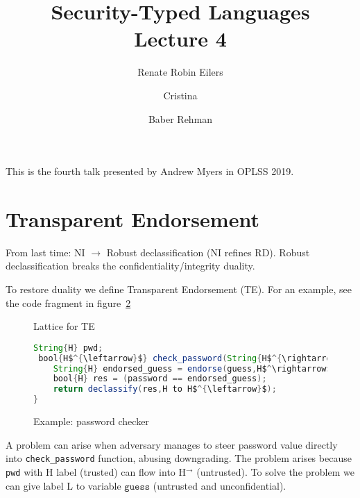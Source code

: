 \documentclass{article}
\title{Security-Typed Languages \\ \Large{Lecture 4}}
\author{Renate Robin Eilers  \and Cristina \and Baber Rehman}
\newcommand{\la}{^{\leftarrow}}
\newcommand{\ra}{^{\rightarrow}}
\begin{document}
\maketitle

This is the fourth talk presented by Andrew Myers in OPLSS 2019.

\section{Transparent Endorsement}

From last time: NI $\rightarrow$ Robust declassification (NI refines RD). Robust declassification breaks the confidentiality/integrity duality.

To restore duality  we define
Transparent Endorsement (TE). For an example, see the code fragment in figure~\ref{code1}
\begin{figure}[ht!]
\label{fig1}
\caption{Lattice for TE}
\end{figure}

\begin{figure}
\begin{lstlisting}[mathescape,frame=single,basicstyle=\ttfamily,language=java]
String{H} pwd;
 bool{H$^{\leftarrow}$} check_password(String{H$^{\rightarrow}$} guess) {
    String{H} endorsed_guess = endorse(guess,H$^\rightarrow$ to H);
    bool{H} res = (password == endorsed_guess);
    return declassify(res,H to H$^{\leftarrow}$);
}
\end{lstlisting}
\label{code1}
\caption{Example: password checker}
\end{figure}

A problem can arise when adversary manages to steer password value directly into \texttt{check\_password} function, abusing downgrading. The problem arises because \texttt{pwd} with H label (trusted) can flow into H$^{\rightarrow}$ (untrusted). To solve the problem we can give label L to variable $\texttt{guess}$ (untrusted and unconfidential).
\end{document}
